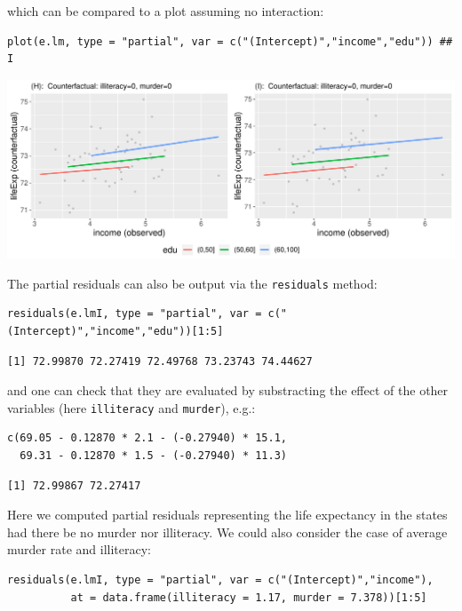 \documentclass[12pt]{article}
\begin{document}
which can be compared to a plot assuming no interaction:
\lstset{language=r,label= ,caption= ,captionpos=b,numbers=none}
\begin{lstlisting}
plot(e.lm, type = "partial", var = c("(Intercept)","income","edu")) ## I
\end{lstlisting}

\begin{center}
\includegraphics[trim={0 0 0 0},width=1\textwidth]{./figures/gg-lmpres-interaction.pdf}
\end{center}


The partial residuals can also be output via the \texttt{residuals} method:
\lstset{language=r,label= ,caption= ,captionpos=b,numbers=none}
\begin{lstlisting}
residuals(e.lmI, type = "partial", var = c("(Intercept)","income","edu"))[1:5]
\end{lstlisting}

\begin{verbatim}
[1] 72.99870 72.27419 72.49768 73.23743 74.44627
\end{verbatim}


and one can check that they are evaluated by substracting the effect
of the other variables (here \texttt{illiteracy} and \texttt{murder}), e.g.:
\lstset{language=r,label= ,caption= ,captionpos=b,numbers=none}
\begin{lstlisting}
c(69.05 - 0.12870 * 2.1 - (-0.27940) * 15.1,
  69.31 - 0.12870 * 1.5 - (-0.27940) * 11.3)
\end{lstlisting}

\begin{verbatim}
[1] 72.99867 72.27417
\end{verbatim}


Here we computed partial residuals representing the life expectancy in
the states had there be no murder nor illiteracy. We could also
consider the case of average murder rate and illiteracy:
\lstset{language=r,label= ,caption= ,captionpos=b,numbers=none}
\begin{lstlisting}
residuals(e.lmI, type = "partial", var = c("(Intercept)","income"),
          at = data.frame(illiteracy = 1.17, murder = 7.378))[1:5]
\end{lstlisting}
\end{document}
